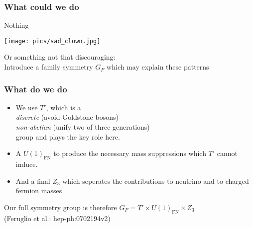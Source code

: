 \documentclass[hyperref={pdfpagelabels=false}]{beamer}
\begin{document}
\begin{frame}
 \frametitle{What could we do}
 \begin{minipage}{0.4\textwidth}
Nothing
 \end{minipage}
 \begin{minipage}{0.5\textwidth}
  \texttt{[image: pics/sad\_clown.jpg]}
 \end{minipage}
 
Or something not that discouraging: \\Introduce a family symmetry $G_F$ which may explain these patterns


\end{frame}

% 
% 
% 
% 

\begin{frame}
\frametitle{What do we do}
 \begin{itemize}
  \item We use $T'$, which is a\\
 \textit{discrete} (avoid Goldstone-bosons)\\
 \textit{non-abelian} (unify two of three generations)\\
 group and plays the key role here.\\
 \item A $U(1)_\text{FN}$ to produce the necessary mass suppressions which $T'$ cannot induce.
 \item And a final $Z_3$ which seperates the contributions to neutrino and to charged fermion masses
 \end{itemize}
 Our full symmetry group is therefore $G_F = T'\times U(1)_\text{FN} \times Z_3$\\ \tiny{(Feruglio et al.: hep-ph:0702194v2)}
\end{frame}
\end{document}
